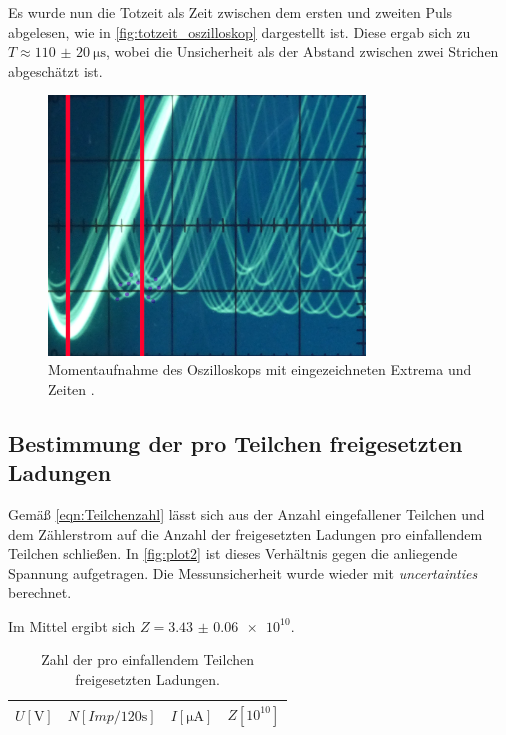 Es wurde nun die Totzeit als Zeit zwischen dem ersten und zweiten Puls abgelesen,
wie in \autoref{fig:totzeit_oszilloskop} dargestellt ist.
Diese ergab sich zu $T \approx \SI{110(20)}{\micro\second}$,
wobei die Unsicherheit als der Abstand zwischen zwei Strichen abgeschätzt ist.

\begin{figure}[H]
  \centering
  \includegraphics[width=0.75\textwidth]{content/img/totzeit_oszilloskop.jpg}
  \caption{Momentaufnahme des Oszilloskops mit eingezeichneten Extrema und Zeiten \cite{oszilloskop}.}
  \label{fig:totzeit_oszilloskop}
\end{figure}

\subsection{Bestimmung der pro Teilchen freigesetzten Ladungen}

Gemäß \autoref{eqn:Teilchenzahl} lässt sich aus der Anzahl eingefallener Teilchen und dem Zählerstrom
auf die Anzahl der freigesetzten Ladungen pro einfallendem Teilchen schließen.
In \autoref{fig:plot2} ist dieses Verhältnis gegen die anliegende Spannung aufgetragen.
Die Messunsicherheit wurde wieder mit \textit{uncertainties} berechnet.

Im Mittel ergibt sich $Z=\num{3.43(6)e+10}$.

\begin{table}[H]
  \centering
  \caption{Zahl der pro einfallendem Teilchen freigesetzten Ladungen.}
  \begin{tabular}{c c c c}
  \toprule
  $U [\si{\volt}]$ &
  $N [\si{{Imp} \per 120 \second}]$ &
  $I [\si{\micro\ampere}]$ &
  $Z [10^{10}]$ \\
  \midrule
  
  \bottomrule
  \end{tabular}
\end{table}

